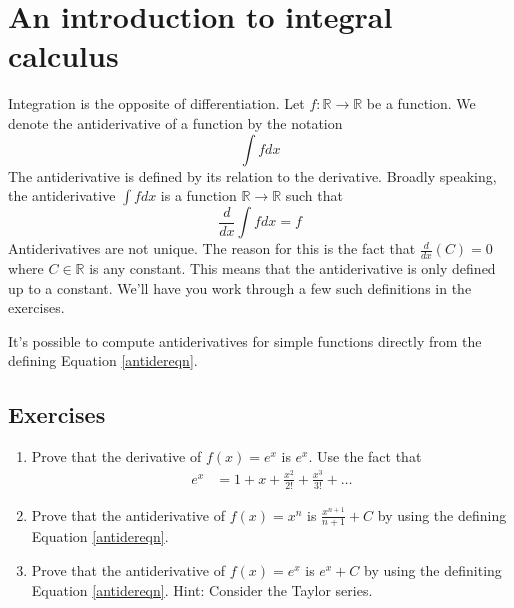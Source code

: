\documentclass[book.tex]{subfiles}
\begin{document}
\section{An introduction to integral calculus}

Integration is the opposite of differentiation. Let $f: \mathbb{R} \to \mathbb{R}$ be a function. We denote the antiderivative of a function by the notation
\begin{equation}
    \int f dx
\end{equation}
The antiderivative is defined by its relation to the derivative. Broadly speaking, the antiderivative $\int f dx$ is a function $\mathbb{R} \to \mathbb{R}$ such that
\begin{equation}
    \frac{d}{dx} \int f dx = f
    \label{antidereqn}
\end{equation}
Antiderivatives are not unique. The reason for this is the fact that $\frac{d}{dx}(C) = 0$ where $C \in \mathbb{R}$ is any constant. This means that the antiderivative is only defined up to a constant. We'll have you work through a few such definitions in the exercises.

It's possible to compute antiderivatives for simple functions directly from the defining Equation \ref{antidereqn}. 

\subsection{Exercises}

\begin{enumerate}
    \item Prove that the derivative of $f(x) = e^x$ is $e^x$. Use the fact that
    \begin{align}
        e^x &= 1 + x + \frac{x^2}{2!} + \frac{x^3}{3!} + \dotsc
    \end{align}
    \item Prove that the antiderivative of $f(x) = x^n$ is $\frac{x^{n+1}}{n+1} + C$ by using the defining Equation \ref{antidereqn}.
    \item Prove that the antiderivative of $f(x) = e^x$ is $e^x + C$ by using the definiting Equation \ref{antidereqn}. Hint: Consider the Taylor series.
\end{enumerate}
\end{document}
